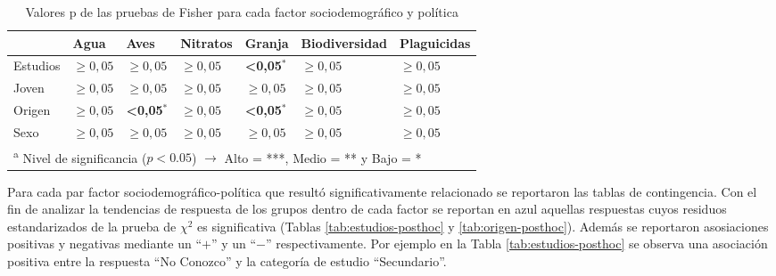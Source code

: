 \documentclass[a4paper, nobind]{templates/ociamthesis}
\begin{document}
\begin{table}[H]

\caption[Asociación entre factores sociodemográficos y PPs]{\label{tab:socio-demograficos-politicas}Valores p de las pruebas de Fisher para cada factor sociodemográfico y política }
\centering
\begin{tabular}[t]{lllllll}
\toprule
  & Agua & Aves & Nitratos & Granja & Biodiversidad & Plaguicidas\\
\midrule
Estudios & $\geq 0,05$ & $\geq 0,05$ & $\geq 0,05$ & \textbf{<0,05}$^{*}$ & $\geq 0,05$ & $\geq 0,05$\\
Joven & $\geq 0,05$ & $\geq 0,05$ & $\geq 0,05$ & $\geq 0,05$ & $\geq 0,05$ & $\geq 0,05$\\
Origen & $\geq 0,05$ & \textbf{<0,05}$^{*}$ & $\geq 0,05$ & \textbf{<0,05}$^{*}$ & $\geq 0,05$ & $\geq 0,05$\\
Sexo & $\geq 0,05$ & $\geq 0,05$ & $\geq 0,05$ & $\geq 0,05$ & $\geq 0,05$ & $\geq 0,05$\\
\bottomrule
\multicolumn{7}{l}{\textsuperscript{a} Nivel de significancia ($p<0.05$) $\rightarrow$ Alto = ***, Medio = ** y Bajo = *}\\
\end{tabular}
\end{table}

Para cada par factor sociodemográfico-política que resultó significativamente relacionado se reportaron las tablas de contingencia. Con el fin de analizar la tendencias de respuesta de los grupos dentro de cada factor se reportan en azul aquellas respuestas cuyos residuos estandarizados de la prueba de \({\chi}^2\) es significativa (Tablas \ref{tab:estudios-posthoc} y \ref{tab:origen-posthoc}). Además se reportaron asosiaciones positivas y negativas mediante un ``\(+\)'' y un ``\(-\)'' respectivamente. Por ejemplo en la Tabla \ref{tab:estudios-posthoc} se observa una asociación positiva entre la respuesta ``No Conozco'' y la categoría de estudio ``Secundario''.
\end{document}
